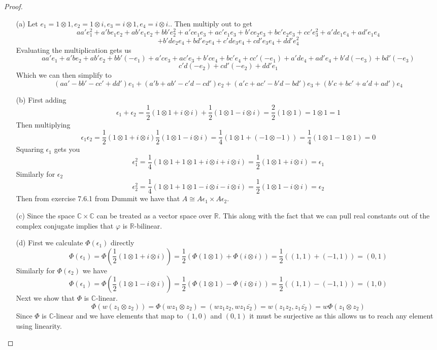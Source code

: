 \documentclass[10pt]{article}
\newcommand{\bb}[1]{\mathbb{#1}}
\theoremstyle{plain}
\theoremstyle{remark}
\begin{document}
\begin{proof}
  \begin{enumerate}
  \item[(a)] Let $e_1=1\otimes 1, e_2=1\otimes i, e_3= i\otimes 1, e_4 = i\otimes i. $. Then multiply out to get
    \[
      a a' e_{1}^{2} + a' b e_{1} e_{2} + a b' e_{1} e_{2} + b b' e_{2}^{2} + a' c e_{1} e_{3} + a c' e_{1} e_{3} + b' c e_{2} e_{3} + b c' e_{2} e_{3} + c c' e_{3}^{2} + a' d e_{1} e_{4} + a d' e_{1} e_{4}
    \]
    \[
      + b' d e_{2} e_{4} + b d' e_{2} e_{4} + c' d e_{3} e_{4} + c d' e_{3} e_{4} + d d' e_{4}^{2}
    \]
    Evaluating the multiplication gets us
    \[
      aa'e_1+a'be_2+ab'e_2 +bb'(-e_1)+a'ce_3+ac'e_3+b'ce_4+bc'e_4+cc'(-e_1)+a'de_4+ad'e_4+b'd(-e_3)+bd'(-e_3)
    \]
    \[
      c'd(-e_2)+cd'(-e_2)+dd'e_1
    \]
    Which we can then simplify to
    \[
      (aa'-bb'-cc'+dd')e_1+(a'b+ab'-c'd-cd')e_2+(a'c+ac'-b'd-bd')e_3+(b'c+bc'+a'd+ad')e_4
    \]
  \item[(b)] First adding
    \[
      \epsilon_1+\epsilon_2=\frac{1}{2}(1\otimes 1+i\otimes i)+\frac{1}{2}(1\otimes 1-i\otimes i)=\frac{2}{2}(1\otimes 1)=1\otimes 1=1
    \]
    Then multiplying
    \[
      \epsilon_1 \epsilon_2=\frac{1}{2}(1\otimes 1+i\otimes i)\frac{1}{2}(1\otimes 1-i\otimes i)=\frac{1}{4}(1\otimes 1+(-1\otimes -1))=\frac{1}{4}(1\otimes 1-1\otimes 1)=0
    \]
    Squaring $\epsilon_1$ gets you
    \[
      \epsilon_1^2=\frac{1}{4}(1\otimes 1+1\otimes 1+i\otimes i +i\otimes i)=\frac{1}{2}(1\otimes 1+i\otimes i)=\epsilon_1
    \]
    Similarly for $\epsilon_2$
    \[
      \epsilon_2^2=\frac{1}{4}(1\otimes 1+1\otimes 1-i\otimes i -i\otimes i)=\frac{1}{2}(1\otimes 1-i\otimes i)=\epsilon_2
    \]
    Then from exercise 7.6.1 from Dummit we have that $A\cong A\epsilon_1\times A\epsilon_2$.
  \item[(c)] Since the space $\bb{C}\times \bb{C}$ can be treated as a vector
    space over $\bb{R}$. This along with the fact that we can pull
    real constants out of the complex conjugate implies that $\varphi$ is
    $\bb{R}$-bilinear.
  \item[(d)] First we calculate $\Phi(\epsilon_1)$ directly
    \[
      \Phi(\epsilon_1)=\Phi(\frac{1}{2}(1\otimes 1+i\otimes i)) =\frac{1}{2}(\Phi(1\otimes 1)+\Phi(i\otimes i)) = \frac{1}{2}((1,1)+(-1,1)) = (0,1)
    \]
    Similarly for $\Phi(\epsilon_2)$ we have
    \[
      \Phi(\epsilon_1)=\Phi(\frac{1}{2}(1\otimes 1-i\otimes i)) =\frac{1}{2}(\Phi(1\otimes 1)-\Phi(i\otimes i)) = \frac{1}{2}((1,1)-(-1,1)) = (1,0)
    \]
    Next we show that $\Phi$ is $\bb{C}$-linear.
    \[
      \Phi(w(z_1\otimes z_2))=\Phi(wz_1\otimes z_2) = (wz_1z_2,wz_1\bar{z_2}) = w(z_1z_2,z_1\bar{z_2})=w\Phi(z_1\otimes z_2)
    \]
    Since $\Phi$ is $\bb{C}$-linear and we have elements that map to $(1,0)$
    and $(0,1)$ it must be surjective as this allows us to reach any
    element using linearity.


\end{enumerate}
\end{proof}
\end{document}
